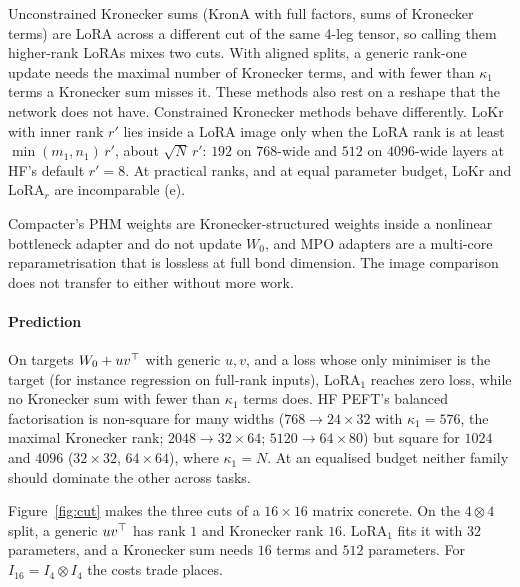 \begin{explains}
Unconstrained Kronecker sums (KronA with full factors, sums of Kronecker terms) are LoRA across a different cut of the
same 4-leg tensor, so calling them higher-rank LoRAs mixes two cuts. With aligned splits, a generic rank-one update needs
the maximal number of Kronecker terms, and with fewer than $\kappa_1$ terms a Kronecker sum misses it. These methods also
rest on a reshape that the network does not have. Constrained Kronecker methods behave differently. LoKr with inner rank
$r'$ lies inside a LoRA image only when the LoRA rank is at least $\min(m_1,n_1)\,r'$, about $\sqrt N\,r'$: $192$ on
$768$-wide and $512$ on $4096$-wide layers at HF's default $r'=8$. At practical ranks, and at equal parameter budget,
LoKr and $\mathrm{LoRA}_r$ are incomparable (e).
\end{explains}

Compacter's PHM weights are Kronecker-structured weights inside a nonlinear bottleneck adapter and do not update $W_0$, and
MPO adapters \citep{xliu2021enabling} are a multi-core reparametrisation that is lossless at full bond dimension. The image
comparison does not transfer to either without more work.

\paragraph{Prediction}
On targets $W_0+uv^{\top}$ with generic $u,v$, and a loss whose only minimiser is the target (for instance regression on
full-rank inputs), LoRA$_1$ reaches zero loss, while no Kronecker sum with fewer than $\kappa_1$ terms does. HF PEFT's
balanced factorisation is non-square for many widths ($768\to24\times32$ with $\kappa_1=576$, the maximal Kronecker rank;
$2048\to32\times64$; $5120\to64\times80$) but square for $1024$ and $4096$ ($32\times32$, $64\times64$), where
$\kappa_1=N$. At an equalised budget neither family should dominate the other across tasks.

Figure~\ref{fig:cut} makes the three cuts of a $16\times16$ matrix concrete. On the $4\otimes4$ split, a generic $uv^{\top}$
has rank $1$ and Kronecker rank $16$. LoRA$_1$ fits it with $32$ parameters, and a Kronecker sum needs $16$ terms and
$512$ parameters. For $I_{16}=I_4\otimes I_4$ the costs trade places.

